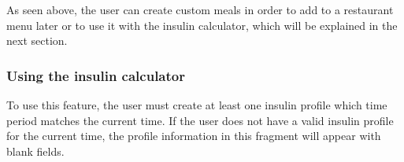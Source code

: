 As seen above, the user can create custom meals in order to add to a restaurant menu later or to use it 
with the insulin calculator, which will be explained in the next section.

\subsubsection{Using the insulin calculator}

To use this feature, the user must create at least one insulin profile which time period matches the current time. If the user does not have a valid insulin profile for the current
time, the profile information in this fragment will appear with blank fields.\\

\begin{figure}[H]
    \captionsetup[subfigure]{justification=centering}
    \begin{center}
        \begin{subfigure}{.3\textwidth}

\end{subfigure}
\end{center}
\end{figure}
